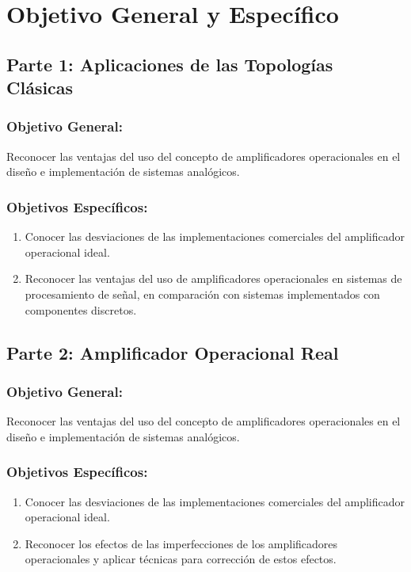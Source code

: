 
\section{Objetivo General y Específico}

    \subsection*{Parte 1: Aplicaciones de las Topologías Clásicas}
    
        \subsubsection*{Objetivo General:}
        Reconocer las ventajas del uso del concepto de amplificadores operacionales en el diseño e implementación de sistemas analógicos.
        
        \subsubsection*{Objetivos Específicos:}
        \begin{enumerate}
            \item Conocer las desviaciones de las implementaciones comerciales del amplificador operacional ideal.
            \item Reconocer las ventajas del uso de amplificadores operacionales en sistemas de procesamiento de señal, en comparación con sistemas implementados con componentes discretos.
        \end{enumerate}
    
    \subsection*{Parte 2: Amplificador Operacional Real}
    
        \subsubsection*{Objetivo General:}
        Reconocer las ventajas del uso del concepto de amplificadores operacionales en el diseño e implementación de sistemas analógicos.
        
        \subsubsection*{Objetivos Específicos:}
        \begin{enumerate}
            \item Conocer las desviaciones de las implementaciones comerciales del amplificador operacional ideal.
            \item Reconocer los efectos de las imperfecciones de los amplificadores operacionales y aplicar técnicas para corrección de estos efectos.
        \end{enumerate}
    
